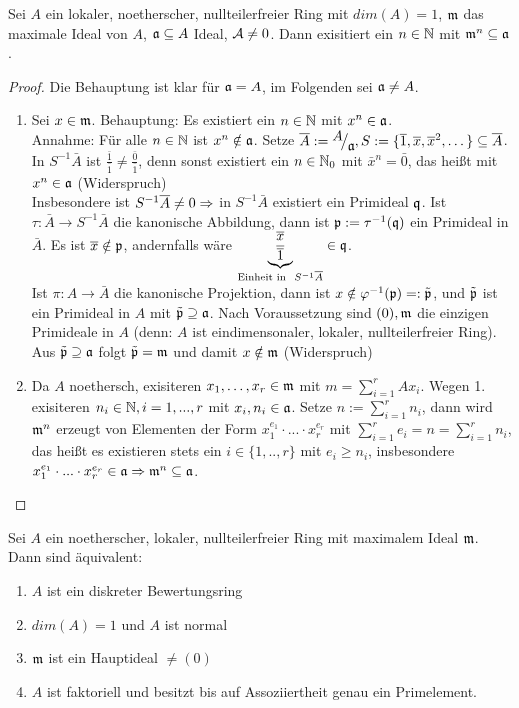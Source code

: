 \begin{bem} \label{17.7}
	Sei $A$ ein lokaler, noetherscher, nullteilerfreier Ring mit $dim(A) =1 $, $\mathfrak{m}$ das maximale Ideal von $A$, $\mathfrak{a} \subseteq A $ Ideal, $\mathcal{A} \neq 0 $. Dann exisitiert ein $n \in \mathbb{N}$ mit $\mathfrak{m}^n \subseteq \mathfrak{a} $. 
\end{bem}
\begin{proof}
	Die Behauptung ist klar für $\mathfrak{a} = A$, im Folgenden sei $\mathfrak{a} \neq A $. 
	\begin{enumerate}
		\item Sei $x \in \mathfrak{m} $. Behauptung: Es existiert ein $n \in \mathbb{N} $ mit $x^n \in \mathfrak{a} $. \\
		Annahme: Für alle $n \in \mathbb{N} $ ist $x^n \notin \mathfrak{a} $. Setze $\bar{A}:= \QR{A}{\a}, S:= \{\bar{1}, \bar{x}, \bar{x}^2, \dots \} \subseteq \bar{A}$. \\
		In $S^{-1}\bar{A} $ ist $ \frac{\bar{1}}{\bar{1}} \neq \frac{\bar{0}}{\bar{1}}$, denn sonst existiert ein $n \in \mathbb{N}_0 $ mit $ \bar{x}^n = \bar{0}$, das heißt mit $x^n \in \mathfrak{a} $ (Widerspruch) \\
		Insbesondere ist $S^{-1}\overline{A} \neq 0 \Rightarrow$ in $S^{-1}\bar{A} $ existiert ein Primideal $\mathfrak{q}$. Ist $\tau: \bar{A} \to S^{-1}\bar{A} $ die kanonische Abbildung, dann ist $\mathfrak{p} := \tau^{-1}(\mathfrak{q}) $ ein Primideal in $\bar{A}$. Es ist $\overline{x} \notin \mathfrak{p} $, andernfalls wäre $ \underbrace{\frac{\overline{x}}{\overline{1}}}_{\text{Einheit in } \ S^{-1}\overline{A}}\in \mathfrak{q} $.\\
		Ist $\pi: A \to \bar{A} $ die kanonische Projektion, dann ist $x \notin \varphi^{-1}(\mathfrak{p}) =: \tilde{\mathfrak{p}}$, und $\tilde{\mathfrak{p}} $ ist ein Primideal in $A$ mit $\tilde{\mathfrak{p} } \supseteq \mathfrak{a} $. Nach Voraussetzung sind $(0), \mathfrak{m} $ die einzigen Primideale in $A$ (denn: $A$ ist eindimensonaler, lokaler, nullteilerfreier Ring). Aus $\tilde{\mathfrak{p}} \supseteq \mathfrak{a} $ folgt $ \tilde{\mathfrak{p}} =\mathfrak{m}$ und damit $ x \notin \mathfrak{m} $ (Widerspruch)
		\item Da $A$ noethersch, exisiteren $x_1,\dots,x_r \in \mathfrak{m} $ mit $ m = \sum_{i = 1}^{r} Ax_i$. Wegen 1. exisiteren $n_i \in\mathbb{N}, i=1,...,r $ mit $x_i,n_i \in \mathfrak{a} $. Setze $n:= \sum_{i = 1}^{r} n_i $, dann wird $\mathfrak{m}^n $ erzeugt von Elementen der Form $ x_1^{e_1} \cdot ... \cdot x_r^{e_r} $ mit $\sum_{i = 1}^{r} e_i =n = \sum_{i = 1}^{r} n_i$, das heißt es existieren stets ein $i \in\{1,..,r\} $ mit $ e_i \geq n_i $, insbesondere $x_1^{e_1} \cdot ... \cdot  x_r^{e_r} \in \mathfrak{a}  \Rightarrow \mathfrak{m}^n \subseteq \mathfrak{a} $. 
	\end{enumerate}
\end{proof}
\begin{sa} \label{17.8}
	Sei $A$ ein noetherscher, lokaler, nullteilerfreier Ring mit maximalem Ideal $\mathfrak{m}$. Dann sind äquivalent: 
	\begin{enumerate} [label= \roman*)]
		\item $A$ ist ein diskreter Bewertungsring
		\item $dim(A) =1 $ und $A$ ist normal 
		\item $\mathfrak{m}$ ist ein Hauptideal $\neq (0)$
		\item $A$ ist faktoriell und besitzt bis auf Assoziiertheit genau ein Primelement.
	\end{enumerate}
\end{sa}
